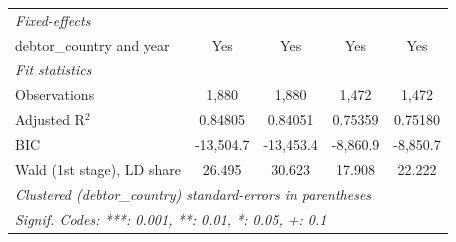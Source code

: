 \begin{table}[htbp]
\begin{tabular}{lcccc}
      \midrule
      \emph{Fixed-effects}\\
      debtor\_country and year   & Yes          & Yes          & Yes      & Yes\\  
      \midrule
      \emph{Fit statistics}\\
      Observations               & 1,880        & 1,880        & 1,472    & 1,472\\  
      Adjusted R$^2$             & 0.84805      & 0.84051      & 0.75359  & 0.75180\\  
      BIC                        & -13,504.7    & -13,453.4    & -8,860.9 & -8,850.7\\  
      Wald (1st stage), LD share & 26.495       & 30.623       & 17.908   & 22.222\\  
      \midrule \midrule
      \multicolumn{5}{l}{\emph{Clustered (debtor\_country) standard-errors in parentheses}}\\
      \multicolumn{5}{l}{\emph{Signif. Codes: ***: 0.001, **: 0.01, *: 0.05, +: 0.1}}\\
   \end{tabular}
\end{table}



